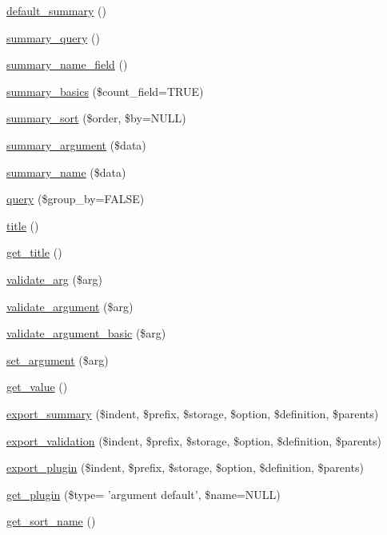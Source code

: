 \begin{DoxyCompactItemize}
\hyperlink{classviews__handler__argument_aa4516957f112b54119015119da20ff1c}{default\_\-summary} ()
\item 
\hyperlink{classviews__handler__argument_a1dd6cc301b1c7c1c6829c59eb641a883}{summary\_\-query} ()
\item 
\hyperlink{classviews__handler__argument_a6432caaadc9ed6e918ae8018bbb03ae2}{summary\_\-name\_\-field} ()
\item 
\hyperlink{classviews__handler__argument_aa5fe1eefd53a7ee6438b34c8cdbb1aec}{summary\_\-basics} (\$count\_\-field=TRUE)
\item 
\hyperlink{classviews__handler__argument_aa5d1fffe25845774985e524b2fd546c5}{summary\_\-sort} (\$order, \$by=NULL)
\item 
\hyperlink{classviews__handler__argument_aad03acefdb44288d7e6c7793bc33f66c}{summary\_\-argument} (\$data)
\item 
\hyperlink{classviews__handler__argument_a4c55a340453eed4d35c69f7ac790cac1}{summary\_\-name} (\$data)
\item 
\hyperlink{classviews__handler__argument_af9ddabf5d386782c8ffc5785b7ae4263}{query} (\$group\_\-by=FALSE)
\item 
\hyperlink{classviews__handler__argument_a76181ac24e7be4a09aaafc1fa5f15ea1}{title} ()
\item 
\hyperlink{classviews__handler__argument_a45cf1f97b44753f32f6e4af75a4c881f}{get\_\-title} ()
\item 
\hyperlink{classviews__handler__argument_a7073b6fd3db280e88bd09d2517a9d767}{validate\_\-arg} (\$arg)
\item 
\hyperlink{classviews__handler__argument_aae090e0aaeabc60dfe06a0c892cabe36}{validate\_\-argument} (\$arg)
\item 
\hyperlink{classviews__handler__argument_ab2ca8b443e4b53e1ca532faf0f4565f5}{validate\_\-argument\_\-basic} (\$arg)
\item 
\hyperlink{classviews__handler__argument_ab5a0444df1eb5d71720e94a0faa0a34c}{set\_\-argument} (\$arg)
\item 
\hyperlink{classviews__handler__argument_a33540b3014b46e56646b03168468b981}{get\_\-value} ()
\item 
\hyperlink{classviews__handler__argument_ad0747dc00a5a67a32550c8fa2508c31d}{export\_\-summary} (\$indent, \$prefix, \$storage, \$option, \$definition, \$parents)
\item 
\hyperlink{classviews__handler__argument_ae7af6b1580463f3795b0ef6d8add3d2e}{export\_\-validation} (\$indent, \$prefix, \$storage, \$option, \$definition, \$parents)
\item 
\hyperlink{classviews__handler__argument_abf6991bce1b9311bbfc3d471df49434e}{export\_\-plugin} (\$indent, \$prefix, \$storage, \$option, \$definition, \$parents)
\item 
\hyperlink{classviews__handler__argument_adbb01e1a343a75f2ad3ecbf91bbbef05}{get\_\-plugin} (\$type= 'argument default', \$name=NULL)
\item 
\hyperlink{classviews__handler__argument_a9fad9ab1a7aaa5915baf13a2872faa70}{get\_\-sort\_\-name} ()
\end{DoxyCompactItemize}

